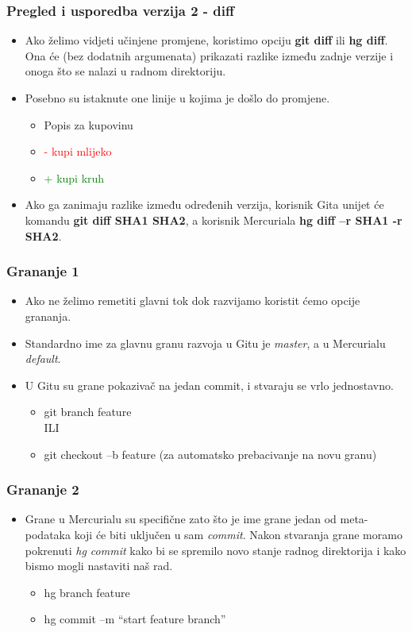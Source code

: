 \documentclass{beamer}
\begin{document}
	\begin{frame}
		\frametitle{Pregled i usporedba verzija 2 - diff}
		\begin{itemize}
			\item Ako želimo vidjeti učinjene promjene, koristimo opciju \textbf{git diff} ili \textbf{hg diff}. Ona će (bez dodatnih argumenata) prikazati razlike između zadnje verzije i onoga što se nalazi u radnom direktoriju.
			\item Posebno su istaknute one linije u kojima je došlo do promjene. \\
			\begin{itemize}						
  				\item Popis za kupovinu
				\item \textcolor{red}{- kupi mlijeko}
				\item \textcolor{green}{+ kupi kruh}
			\end{itemize}
			\item Ako ga zanimaju razlike između određenih verzija, korisnik Gita unijet će komandu \textbf{git diff SHA1 SHA2}, a korisnik Mercuriala \textbf{hg diff –r SHA1 -r SHA2}.
		\end{itemize}
	\end{frame}

	\begin{frame}
		\frametitle{Grananje 1}
		\begin{itemize}
			\item Ako ne želimo remetiti glavni tok dok razvijamo koristit ćemo opcije grananja.
			\item Standardno ime za glavnu granu razvoja u Gitu je \textit{master}, a u Mercurialu \textit{default}.
			\item U Gitu su grane pokazivač na jedan commit, i stvaraju se vrlo jednostavno.
			\begin{itemize}
				\item git branch feature
				 \\ILI
				\item git checkout –b feature (za automatsko prebacivanje na novu granu)
			\end{itemize}
		\end{itemize}
	\end{frame}
 
	\begin{frame}
		\frametitle{Grananje 2}
		\begin{itemize}
			\item Grane u Mercurialu su specifične zato što je ime grane jedan od meta-podataka koji će biti uključen u sam \textit{commit}. Nakon stvaranja grane moramo pokrenuti \textit{hg commit} kako bi se spremilo novo stanje radnog direktorija i kako bismo mogli nastaviti naš rad.
			\begin{itemize}
				\item hg branch feature
				\item hg commit –m “start feature branch”
			\end{itemize}
		\end{itemize}
	\end{frame}
\end{document}
